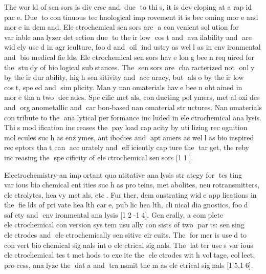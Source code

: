 {The world of sensors is diverse and due to this, it is developing
at a rapid pace. Due to continuous technological improvement it is
becoming more and more in demand. Electrochemical sensors are a
convenient solution for variable analyzer detection due to their
low cost and availability and are widely used in agriculture,
food and oil industry as well as in environmental and biomedical
fields. Electrochemical sensors have long been required for the
study of biological substances. The sensors are characterized
not only by their durability, high sensitivity and accuracy,
but also by their low cost, speed and simplicity. Many
nanomaterials have been obtained in more than two decades.
Specific metals, conducting polymers, metal oxides and
organometallic and carbon-based nanomaterial structures.
Nanomaterials contribute to the analytical performance included in
electrochemical analysis. This modification increases the payload
capacity by utilizing recognition molecules such as enzymes,
antibodies and aptamers as well as bioinspired receptors that
can accurately and efficiently capture the target, thereby
increasing the specificity of electrochemical sensors {[}11{]}.

Electrochemistry-an important quantitative analysis strategy for
testing various biochemical entities such as proteins,
metabolites, neurotransmitters, electrolytes, heavy metals, etc.
Further, demonstrating wide applications in the fields of private
health care, public health, clinical diagnostics, food safety
and environmental analysis {[}12-14{]}. Generally, a complete
electrochemical conversion system usually consists of two parts:
sensing electrodes and electrochemically sensitive circuits. The
former is used to convert biochemical signals into electrical
signals. The latter uses various electrochemical test methods to
excite the electrodes with voltage, collect, process, analyze
the data and transmit them as electrical signals {[}15,16{]}.

}

